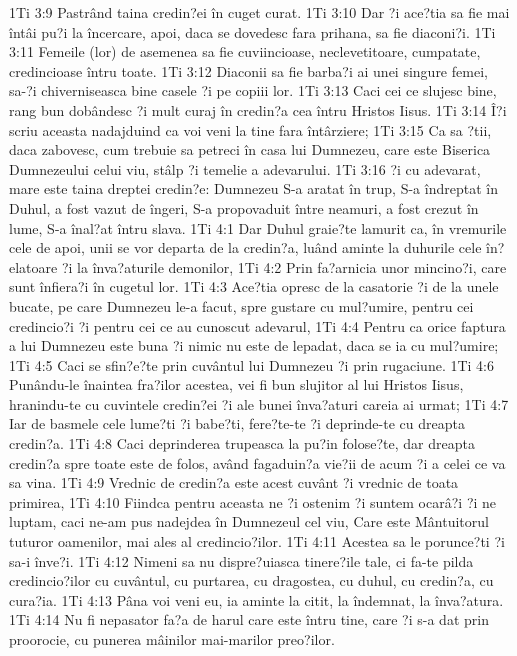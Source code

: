 1Ti 3:9  Pastrând taina credin?ei în cuget curat.
1Ti 3:10  Dar ?i ace?tia sa fie mai întâi pu?i la încercare, apoi, daca se dovedesc fara prihana, sa fie diaconi?i.
1Ti 3:11  Femeile (lor) de asemenea sa fie cuviincioase, neclevetitoare, cumpatate, credincioase întru toate.
1Ti 3:12  Diaconii sa fie barba?i ai unei singure femei, sa-?i chiverniseasca bine casele ?i pe copiii lor.
1Ti 3:13  Caci cei ce slujesc bine, rang bun dobândesc ?i mult curaj în credin?a cea întru Hristos Iisus.
1Ti 3:14  Î?i scriu aceasta nadajduind ca voi veni la tine fara întârziere;
1Ti 3:15  Ca sa ?tii, daca zabovesc, cum trebuie sa petreci în casa lui Dumnezeu, care este Biserica Dumnezeului celui viu, stâlp ?i temelie a adevarului.
1Ti 3:16  ?i cu adevarat, mare este taina dreptei credin?e: Dumnezeu S-a aratat în trup, S-a îndreptat în Duhul, a fost vazut de îngeri, S-a propovaduit între neamuri, a fost crezut în lume, S-a înal?at întru slava.
1Ti 4:1  Dar Duhul graie?te lamurit ca, în vremurile cele de apoi, unii se vor departa de la credin?a, luând aminte la duhurile cele în?elatoare ?i la înva?aturile demonilor,
1Ti 4:2  Prin fa?arnicia unor mincino?i, care sunt înfiera?i în cugetul lor.
1Ti 4:3  Ace?tia opresc de la casatorie ?i de la unele bucate, pe care Dumnezeu le-a facut, spre gustare cu mul?umire, pentru cei credincio?i ?i pentru cei ce au cunoscut adevarul,
1Ti 4:4  Pentru ca orice faptura a lui Dumnezeu este buna ?i nimic nu este de lepadat, daca se ia cu mul?umire;
1Ti 4:5  Caci se sfin?e?te prin cuvântul lui Dumnezeu ?i prin rugaciune.
1Ti 4:6  Punându-le înaintea fra?ilor acestea, vei fi bun slujitor al lui Hristos Iisus, hranindu-te cu cuvintele credin?ei ?i ale bunei înva?aturi careia ai urmat;
1Ti 4:7  Iar de basmele cele lume?ti ?i babe?ti, fere?te-te ?i deprinde-te cu dreapta credin?a.
1Ti 4:8  Caci deprinderea trupeasca la pu?in folose?te, dar dreapta credin?a spre toate este de folos, având fagaduin?a vie?ii de acum ?i a celei ce va sa vina.
1Ti 4:9  Vrednic de credin?a este acest cuvânt ?i vrednic de toata primirea,
1Ti 4:10  Fiindca pentru aceasta ne ?i ostenim ?i suntem ocarâ?i ?i ne luptam, caci ne-am pus nadejdea în Dumnezeul cel viu, Care este Mântuitorul tuturor oamenilor, mai ales al credincio?ilor.
1Ti 4:11  Acestea sa le porunce?ti ?i sa-i înve?i.
1Ti 4:12  Nimeni sa nu dispre?uiasca tinere?ile tale, ci fa-te pilda credincio?ilor cu cuvântul, cu purtarea, cu dragostea, cu duhul, cu credin?a, cu cura?ia.
1Ti 4:13  Pâna voi veni eu, ia aminte la citit, la îndemnat, la înva?atura.
1Ti 4:14  Nu fi nepasator fa?a de harul care este întru tine, care ?i s-a dat prin proorocie, cu punerea mâinilor mai-marilor preo?ilor.
